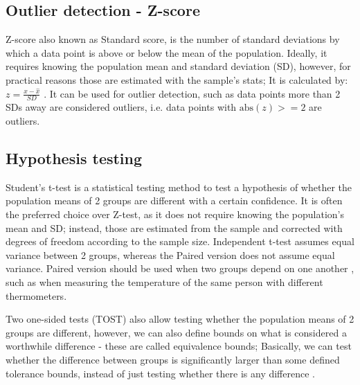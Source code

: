 \subsection{Outlier detection - Z-score}
Z-score also known as Standard score, is the number of standard deviations by which a data point is above or below the mean of the population. Ideally, it requires knowing the population mean and standard deviation (SD), however, for practical reasons those are estimated with the sample's stats; It is calculated by: $z=\frac{x-\hat{x}}{SD}$ \cite{zscoreBook}. It can be used for outlier detection, such as data points more than 2 SDs away are considered outliers, i.e. data points with $\text{abs}(z) >= 2$ are outliers.
\subsection{Hypothesis testing}
Student's t-test is a statistical testing method to test a hypothesis of whether the population means of 2 groups are different with a certain confidence. It is often the preferred choice over Z-test, as it does not require knowing the population's mean and SD; instead, those are estimated from the sample and corrected with degrees of freedom according to the sample size. Independent t-test assumes equal variance between 2 groups, whereas the Paired version does not assume equal variance. Paired version should be used when two groups depend on one another \cite{LIVINGSTON200458}, such as when measuring the temperature of the same person with different thermometers.

Two one-sided tests (TOST) also allow testing whether the population means of 2 groups are different, however, we can also define bounds on what is considered a worthwhile difference - these are called equivalence bounds; Basically, we can test whether the difference between groups is significantly larger than some defined tolerance bounds, instead of just testing whether there is any difference \cite{tost}.
